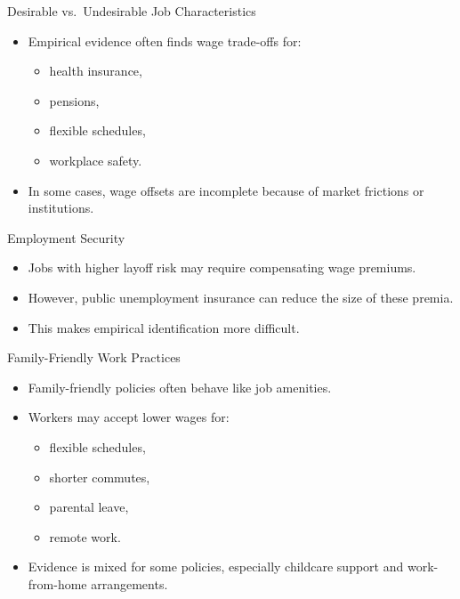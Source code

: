 \documentclass[aspectratio=169]{beamer}
\begin{document}
\begin{frame}{Desirable vs.\ Undesirable Job Characteristics}
\transfade
\begin{itemize}[<+->]
  \item Empirical evidence often finds wage trade-offs for:
  \begin{itemize}[<+->]
    \item health insurance,
    \item pensions,
    \item flexible schedules,
    \item workplace safety.
  \end{itemize}
  \item In some cases, wage offsets are incomplete because of market frictions or institutions.
\end{itemize}
\end{frame}

\begin{frame}{Employment Security}
\transfade
\begin{itemize}[<+->]
  \item Jobs with higher layoff risk may require compensating wage premiums.
  \item However, public unemployment insurance can reduce the size of these premia.
  \item This makes empirical identification more difficult.
\end{itemize}
\end{frame}

\begin{frame}{Family-Friendly Work Practices}
\transfade
\begin{itemize}[<+->]
  \item Family-friendly policies often behave like job amenities.
  \item Workers may accept lower wages for:
  \begin{itemize}[<+->]
    \item flexible schedules,
    \item shorter commutes,
    \item parental leave,
    \item remote work.
  \end{itemize}
  \item Evidence is mixed for some policies, especially childcare support and work-from-home arrangements.
\end{itemize}
\end{frame}
\end{document}
